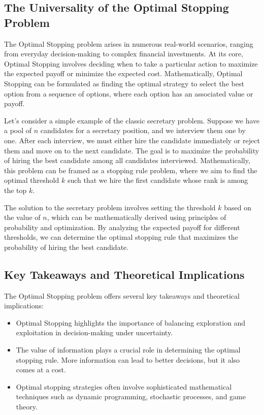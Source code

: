 \documentclass[12pt]{book} %
\begin{document}
\subsection{The Universality of the Optimal Stopping Problem}
The Optimal Stopping problem arises in numerous real-world scenarios, ranging from everyday decision-making to complex financial investments. At its core, Optimal Stopping involves deciding when to take a particular action to maximize the expected payoff or minimize the expected cost. Mathematically, Optimal Stopping can be formulated as finding the optimal strategy to select the best option from a sequence of options, where each option has an associated value or payoff.

Let's consider a simple example of the classic secretary problem. Suppose we have a pool of \(n\) candidates for a secretary position, and we interview them one by one. After each interview, we must either hire the candidate immediately or reject them and move on to the next candidate. The goal is to maximize the probability of hiring the best candidate among all candidates interviewed. Mathematically, this problem can be framed as a stopping rule problem, where we aim to find the optimal threshold \(k\) such that we hire the first candidate whose rank is among the top \(k\).

The solution to the secretary problem involves setting the threshold \(k\) based on the value of \(n\), which can be mathematically derived using principles of probability and optimization. By analyzing the expected payoff for different thresholds, we can determine the optimal stopping rule that maximizes the probability of hiring the best candidate.

\subsection{Key Takeaways and Theoretical Implications}
The Optimal Stopping problem offers several key takeaways and theoretical implications:

\begin{itemize}
    \item Optimal Stopping highlights the importance of balancing exploration and exploitation in decision-making under uncertainty.
    \item The value of information plays a crucial role in determining the optimal stopping rule. More information can lead to better decisions, but it also comes at a cost.
    \item Optimal stopping strategies often involve sophisticated mathematical techniques such as dynamic programming, stochastic processes, and game theory.
\end{itemize}
\end{document}
